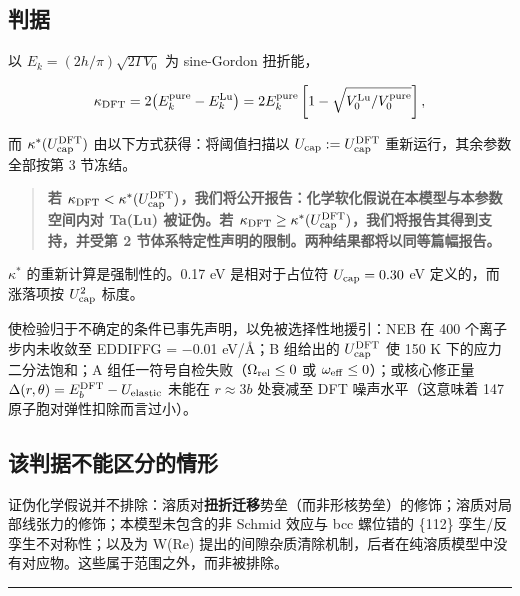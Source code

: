 \documentclass[11pt,a4paper]{article}
\begin{document}
\hypertarget{ux5224ux636e}{%
\subsection{判据}\label{sec:ux5224ux636e}}

以 \(E_k = (2h/\pi)\sqrt{2\Gamma V_0}\) 为 sine-Gordon 扭折能，

\[\kappa_{\rm DFT} = 2\bigl(E_k^{\rm pure} - E_k^{\rm Lu}\bigr) = 2E_k^{\rm pure}\left[1 - \sqrt{V_0^{\rm Lu}/V_0^{\rm pure}}\right],\]

而 \(\kappa^*(U_{\rm cap}^{\rm DFT})\) 由以下方式获得：将阈值扫描以 \(U_{\rm cap} := U_{\rm cap}^{\rm DFT}\) 重新运行，其余参数全部按第 3 节冻结。

\begin{quote}
\textbf{若 \(\kappa_{\rm DFT} < \kappa^*(U_{\rm cap}^{\rm DFT})\)，我们将公开报告：化学软化假说在本模型与本参数空间内对 Ta(Lu) 被证伪。若 \(\kappa_{\rm DFT} \geq \kappa^*(U_{\rm cap}^{\rm DFT})\)，我们将报告其得到支持，并受第 2 节体系特定性声明的限制。两种结果都将以同等篇幅报告。}
\end{quote}

\(\kappa^*\) 的重新计算是强制性的。0.17 eV 是相对于占位符 \(U_{\rm cap} = 0.30\) eV 定义的，而涨落项按 \(U_{\rm cap}^2\) 标度。

使检验归于不确定的条件已事先声明，以免被选择性地援引：NEB 在 400 个离子步内未收敛至 EDDIFFG = −0.01 eV/Å；B 组给出的 \(U_{\rm cap}^{\rm DFT}\) 使 150 K 下的应力二分法饱和；A 组任一符号自检失败（\(\Omega_{\rm rel} \leq 0\) 或 \(\omega_{\rm eff} \leq 0\)）；或核心修正量 \(\Delta(r,\theta) = E_b^{\rm DFT} - U_{\rm elastic}\) 未能在 \(r\approx3b\) 处衰减至 DFT 噪声水平（这意味着 147 原子胞对弹性扣除而言过小）。

\hypertarget{ux8be5ux5224ux636eux4e0dux80fdux533aux5206ux7684ux60c5ux5f62}{%
\subsection{该判据不能区分的情形}\label{sec:ux8be5ux5224ux636eux4e0dux80fdux533aux5206ux7684ux60c5ux5f62}}

证伪化学假说并不排除：溶质对\textbf{扭折迁移}势垒（而非形核势垒）的修饰；溶质对局部线张力的修饰；本模型未包含的非 Schmid 效应与 bcc 螺位错的 \{112\} 孪生/反孪生不对称性；以及为 W(Re) 提出的间隙杂质清除机制，后者在纯溶质模型中没有对应物。这些属于范围之外，而非被排除。

\begin{center}\rule{0.5\linewidth}{0.5pt}\end{center}
\end{document}
